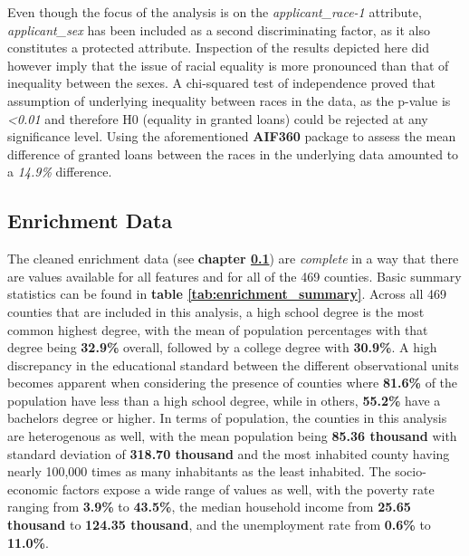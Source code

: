 Even though the focus of the analysis is on the \textit{applicant\_race-1} attribute, \textit{applicant\_sex} has been included as a second discriminating factor, as it also constitutes a protected attribute.
Inspection of the results depicted here did however imply that the issue of racial equality is more pronounced than that of inequality between the sexes.
A chi-squared test of independence proved that assumption of underlying inequality between races in the data, as the p-value is \textit{<0.01} and therefore H0 (equality in granted loans) could be rejected at any significance level.
Using the aforementioned \textbf{AIF360} package to assess the mean difference of granted loans between the races in the underlying data amounted to a \textit{14.9\%} difference.

\subsection{Enrichment Data}\label{subsec:Enrichment_Data}

The cleaned enrichment data (see \textbf{chapter \ref{subsec:Enrichment_Data}}) are \textit{complete} in a way that there are values available for all features and for all of the 469 counties. Basic summary statistics can be found in \textbf{table \ref{tab:enrichment_summary}}. 
Across all 469 counties that are included in this analysis, a high school degree is the most common highest degree, with the mean of population percentages with that degree being \textbf{32.9\%} overall, followed by a college degree with \textbf{30.9\%}. 
A high discrepancy in the educational standard between the different observational units becomes apparent when considering the presence of counties where \textbf{81.6\%} of the population have less than a high school degree, while in others, \textbf{55.2\%} have a bachelors degree or higher.
In terms of population, the counties in this analysis are heterogenous as well, with the mean population being \textbf{85.36 thousand} with standard deviation of \textbf{318.70 thousand} and the most inhabited county having nearly 100,000 times as many inhabitants as the least inhabited.
The socio-economic factors expose a wide range of values as well, with the poverty rate ranging from \textbf{3.9\%} to \textbf{43.5\%}, the median household income from \textbf{25.65 thousand} to \textbf{124.35 thousand}, and the unemployment rate from \textbf{0.6\%} to \textbf{11.0\%}.


